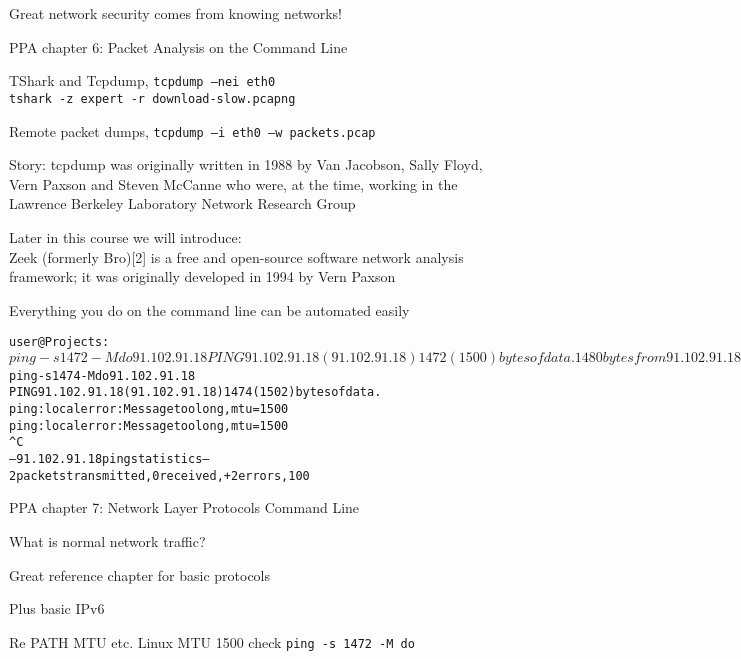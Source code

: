 \documentclass[Screen16to9,17pt]{foils}
\begin{document}
\vskip 5mm
\centerline{\Large Great network security comes from knowing networks!}


\begin{list1}
\item PPA chapter 6: Packet Analysis on the Command Line
\begin{list2}
\item TShark and Tcpdump, \verb+tcpdump –nei eth0+\\
\verb+tshark -z expert -r download-slow.pcapng+

\item Remote packet dumps, \verb+tcpdump –i eth0 –w packets.pcap+
\end{list2}
\item Story: tcpdump was originally written in 1988 by Van Jacobson, Sally Floyd, Vern Paxson and Steven McCanne who were, at the time, working in the Lawrence Berkeley Laboratory Network Research Group

\item Later in this course we will introduce:\\
Zeek (formerly Bro)[2] is a free and open-source software network analysis framework; it was originally developed in 1994 by Vern Paxson
\end{list1}

\vskip 5mm
\centerline{\Large Everything you do on the command line can be automated easily}



\begin{alltt}\footnotesize
user@Projects:~$ ping -s 1472 -M do 91.102.91.18
PING 91.102.91.18 (91.102.91.18) 1472(1500) bytes of data.
1480 bytes from 91.102.91.18: icmp_seq=1 ttl=244 time=7.43 ms
1480 bytes from 91.102.91.18: icmp_seq=2 ttl=244 time=7.20 ms
...
user@Projects:~$ ping -s 1474 -M do 91.102.91.18
PING 91.102.91.18 (91.102.91.18) 1474(1502) bytes of data.
ping: local error: Message too long, mtu=1500
ping: local error: Message too long, mtu=1500
^C
--- 91.102.91.18 ping statistics ---
2 packets transmitted, 0 received, +2 errors, 100% packet loss, time 1025ms
\end{alltt}

\begin{list1}
\item PPA chapter 7: Network Layer Protocols
Command Line
\begin{list2}
\item What is normal network traffic?
\item Great reference chapter for basic protocols
\item Plus basic IPv6
\item Re PATH MTU etc. Linux MTU 1500 check \verb+ping -s 1472 -M do+
\end{list2}
\end{list1}
\end{document}
